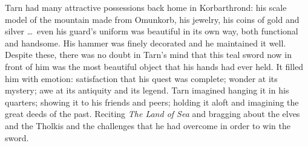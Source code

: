Tarn had many attractive possessions back home in Korbarthrond: his scale model of the mountain made from Omunkorb, his jewelry, his coins of gold and silver \ldots\ even his guard's uniform was beautiful in its own way, both functional and handsome.  His hammer was finely decorated and he maintained it well.  Despite these, there was no doubt in Tarn's mind that this teal sword now in front of him was the most beautiful object that his hands had ever held.  It filled him with emotion: satisfaction that his quest was complete; wonder at its mystery; awe at its antiquity and its legend.  Tarn imagined hanging it in his quarters; showing it to his friends and peers; holding it aloft and imagining the great deeds of the past.  Reciting \emph{The Land of Sea} and bragging about the elves and the Tholkis and the challenges that he had overcome in order to win the sword.